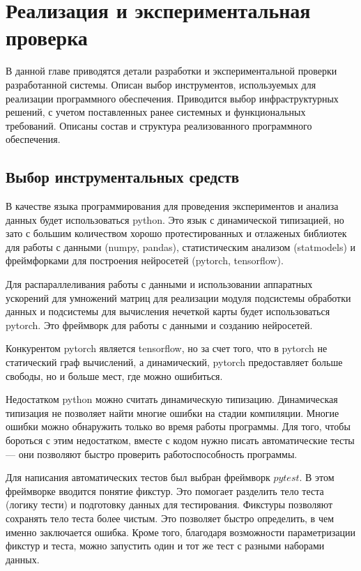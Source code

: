 \chapter{Реализация и экспериментальная проверка}

\begin{annotation}
	В данной главе приводятся детали разработки и экспериментальной проверки
	разработанной системы. Описан выбор инструментов, используемых для реализации
	программного обеспечения. Приводится выбор инфраструктурных решений,
	с учетом поставленных ранее системных и функциональных требований.
	Описаны состав и структура реализованного программного обеспечения.
\end{annotation}




\section{Выбор инструментальных средств}

В качестве языка программирования для проведения экспериментов и анализа данных
будет использоваться python. Это язык с динамической типизацией, но зато с
большим количеством хорошо протестированных и отлаженых библиотек для работы
с данными (numpy, pandas), статистическим анализом (statmodels) и фреймфорками для построения нейросетей (pytorch, tensorflow).

Для распараллеливания работы с данными и использовании аппаратных ускорений для умножений матриц
для реализации модуля подсистемы обработки данных и подсистемы для вычисления нечеткой карты
будет использоваться pytorch. Это фреймворк для работы с данными и созданию нейросетей.

Конкурентом pytorch является tensorflow, но за счет того, что в pytorch не статический
граф вычислений, а динамический, pytorch предоставляет больше свободы, но и больше мест,
где можно ошибиться.

Недостатком python можно считать динамическую типизацию. Динамическая типизация не позволяет
найти многие ошибки на стадии компиляции. Многие ошибки можно обнаружить только во время
работы программы. Для того, чтобы бороться с этим недостатком, вместе с кодом нужно писать
автоматические тесты --- они позволяют быстро проверить работоспособность программы.

Для написания автоматических тестов был выбран фреймворк $ pytest $. В этом фреймворке
вводится понятие фикстур. Это помогает разделить тело теста (логику тести) и
подготовку данных для тестирования. Фикстуры позволяют сохранять тело
теста более чистым. Это позволяет быстро определить, в чем именно заключается ошибка.
Кроме того, благодаря возможности параметризации фикстур и теста, можно
запустить один и тот же тест с разными наборами данных.

